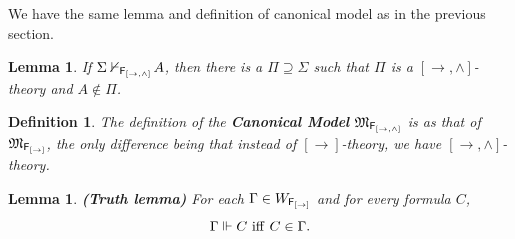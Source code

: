 \documentclass[12pt]{article}
\newtheorem{lem}[thm]{Lemma}
\newtheorem{dfn}[thm]{Definition}
\begin{document}
We have the same lemma and definition of canonical model as in the previous section.


\begin{lem}
\label{g1}
 If $ \Sigma\nvdash_{{\sf F_{[\rightarrow, \wedge]}} }\!A$, then there is a $ \Pi\supseteq \Sigma $  such that $ \Pi $ is a $ {[\rightarrow, \wedge]} $-theory and  $ A \notin \Pi $.
\end{lem}


\begin{dfn}The definition of the \textbf{Canonical Model} $  \mathfrak{M}_{{\sf F_{[\rightarrow, \wedge]}}} $ is  as that of $ \mathfrak{M}_{{\sf F_{[\rightarrow]}}}$, the only difference being that instead of $ {[\rightarrow]} $-theory, we have ${[\rightarrow, \wedge]} $-theory.


\end{dfn}

\begin{lem}\label{D2}
\em\textbf{(Truth lemma)} For each $ \Gamma \in  W_{{\sf F_{[\rightarrow]}}}$ and for every formula $  C $, $$ \Gamma\Vdash   C~{\rm iff}~ C \in \Gamma .$$
\end{lem}
\end{document}
